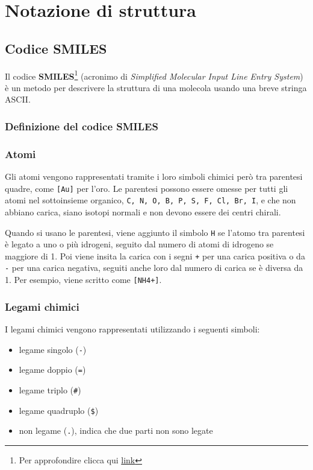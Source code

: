 \chapter{Notazione di struttura}


\section{Codice SMILES}\label{sec:smiles}
Il codice \textbf{SMILES}\footnote{Per approfondire clicca qui \href{https://www.daylight.com/dayhtml/doc/theory/theory.smiles.html}{link}} (acronimo di \textit{Simplified Molecular Input Line Entry System}) è un metodo per descrivere la struttura di una molecola usando una breve stringa ASCII.

\subsection{Definizione del codice SMILES}
\subsection*{Atomi}
Gli atomi vengono rappresentati tramite i loro simboli chimici però tra parentesi quadre, come \verb|[Au]| per l'oro. Le parentesi possono essere omesse per tutti gli atomi nel sottoinsieme organico, \verb|C, N, O, B, P, S, F, Cl, Br, I|, e che non abbiano carica, siano isotopi normali e non devono essere dei centri chirali.

Quando si usano le parentesi, viene aggiunto il simbolo \verb|H| se l'atomo tra parentesi è legato a uno o più idrogeni, seguito dal numero di atomi di idrogeno se maggiore di 1. Poi viene insita la carica con i segni \verb|+| per una carica positiva o da \verb|-| per una carica negativa, seguiti anche loro dal numero di carica se è diversa da 1. Per esempio,  viene scritto come \verb|[NH4+]|.
\subsection*{Legami chimici}

\noindent I legami chimici vengono rappresentati utilizzando i seguenti simboli:
\begin{itemize}
	\item legame singolo (\verb|-|)
	\item legame doppio (\verb|=|)
	\item legame triplo (\verb|#|)
	\item legame quadruplo (\verb|$|)
	\item non legame (\verb|.|), indica che due parti non sono legate
\end{itemize}

